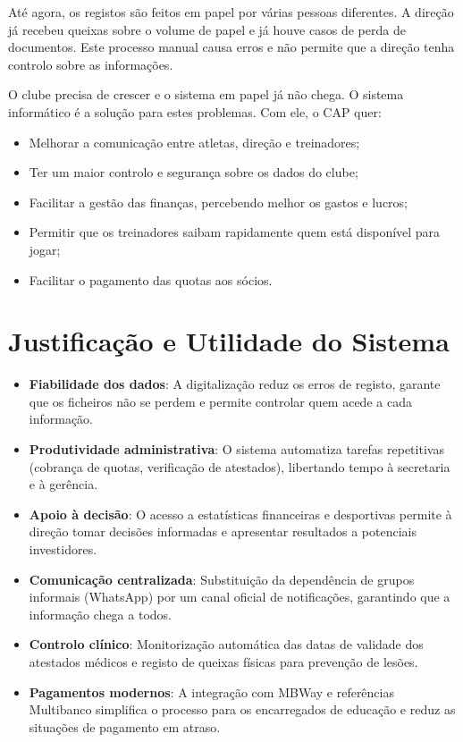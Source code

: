 Até agora, os registos são feitos em papel por várias pessoas diferentes. A direção já recebeu queixas sobre o volume de papel e já houve casos de perda de documentos. Este processo manual causa erros e não permite que a direção tenha controlo sobre as informações.

O clube precisa de crescer e o sistema em papel já não chega. O sistema informático é a solução para estes problemas. Com ele, o CAP quer:
\begin{itemize}
    \item Melhorar a comunicação entre atletas, direção e treinadores;
    \item Ter um maior controlo e segurança sobre os dados do clube;
    \item Facilitar a gestão das finanças, percebendo melhor os gastos e lucros;
    \item Permitir que os treinadores saibam rapidamente quem está disponível para jogar;
    \item Facilitar o pagamento das quotas aos sócios.
\end{itemize}

\section{Justificação e Utilidade do Sistema}
\begin{itemize}
    \item \textbf{Fiabilidade dos dados}: A digitalização reduz os erros de registo, garante que os ficheiros não se perdem e permite controlar quem acede a cada informação.
    \item \textbf{Produtividade administrativa}: O sistema automatiza tarefas repetitivas (cobrança de quotas, verificação de atestados), libertando tempo à secretaria e à gerência.
    \item \textbf{Apoio à decisão}: O acesso a estatísticas financeiras e desportivas permite à direção tomar decisões informadas e apresentar resultados a potenciais investidores.
    \item \textbf{Comunicação centralizada}: Substituição da dependência de grupos informais (WhatsApp) por um canal oficial de notificações, garantindo que a informação chega a todos.
    \item \textbf{Controlo clínico}: Monitorização automática das datas de validade dos atestados médicos e registo de queixas físicas para prevenção de lesões.
    \item \textbf{Pagamentos modernos}: A integração com MBWay e referências Multibanco simplifica o processo para os encarregados de educação e reduz as situações de pagamento em atraso.
\end{itemize}
